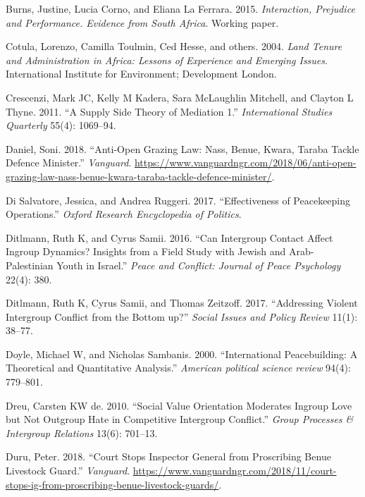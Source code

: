 \documentclass[11pt]{article}
\begin{document}
\leavevmode\hypertarget{ref-burns2015interaction}{}%
Burns, Justine, Lucia Corno, and Eliana La Ferrara. 2015.
\emph{Interaction, Prejudice and Performance. Evidence from South
Africa}. Working paper.

\leavevmode\hypertarget{ref-cotula2004land}{}%
Cotula, Lorenzo, Camilla Toulmin, Ced Hesse, and others. 2004.
\emph{Land Tenure and Administration in Africa: Lessons of Experience
and Emerging Issues}. International Institute for Environment;
Development London.

\leavevmode\hypertarget{ref-crescenzi2011supply}{}%
Crescenzi, Mark JC, Kelly M Kadera, Sara McLaughlin Mitchell, and
Clayton L Thyne. 2011. ``A Supply Side Theory of Mediation 1.''
\emph{International Studies Quarterly} 55(4): 1069--94.

\leavevmode\hypertarget{ref-daniel2018anti}{}%
Daniel, Soni. 2018. ``Anti-Open Grazing Law: Nass, Benue, Kwara, Taraba
Tackle Defence Minister.'' \emph{Vanguard}.
\url{https://www.vanguardngr.com/2018/06/anti-open-grazing-law-nass-benue-kwara-taraba-tackle-defence-minister/}.

\leavevmode\hypertarget{ref-di2017effectiveness}{}%
Di Salvatore, Jessica, and Andrea Ruggeri. 2017. ``Effectiveness of
Peacekeeping Operations.'' \emph{Oxford Research Encyclopedia of
Politics}.

\leavevmode\hypertarget{ref-ditlmann2016can}{}%
Ditlmann, Ruth K, and Cyrus Samii. 2016. ``Can Intergroup Contact Affect
Ingroup Dynamics? Insights from a Field Study with Jewish and
Arab-Palestinian Youth in Israel.'' \emph{Peace and Conflict: Journal of
Peace Psychology} 22(4): 380.

\leavevmode\hypertarget{ref-ditlmann2017addressing}{}%
Ditlmann, Ruth K, Cyrus Samii, and Thomas Zeitzoff. 2017. ``Addressing
Violent Intergroup Conflict from the Bottom up?'' \emph{Social Issues
and Policy Review} 11(1): 38--77.

\leavevmode\hypertarget{ref-doyle2000international}{}%
Doyle, Michael W, and Nicholas Sambanis. 2000. ``International
Peacebuilding: A Theoretical and Quantitative Analysis.'' \emph{American
political science review} 94(4): 779--801.

\leavevmode\hypertarget{ref-dreu2010social}{}%
Dreu, Carsten KW de. 2010. ``Social Value Orientation Moderates Ingroup
Love but Not Outgroup Hate in Competitive Intergroup Conflict.''
\emph{Group Processes \& Intergroup Relations} 13(6): 701--13.

\leavevmode\hypertarget{ref-duru2018court}{}%
Duru, Peter. 2018. ``Court Stops Inspector General from Proscribing
Benue Livestock Guard.'' \emph{Vanguard}.
\url{https://www.vanguardngr.com/2018/11/court-stops-ig-from-proscribing-benue-livestock-guards/}.
\end{document}
